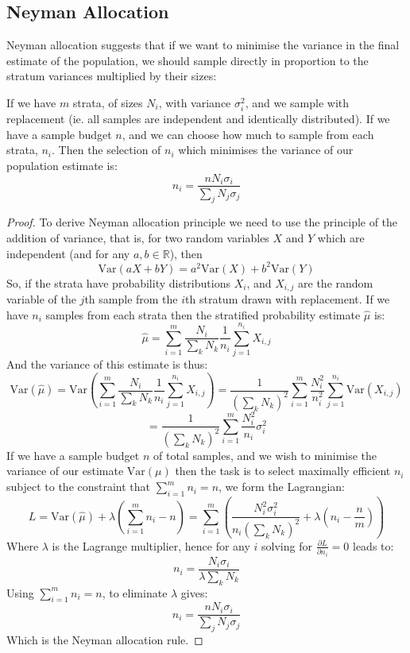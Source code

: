 \subsection{Neyman Allocation}\label{sec:neyman_sampling}

Neyman allocation suggests that if we want to minimise the variance in the final estimate of the population, we should sample directly in proportion to the stratum variances multiplied by their sizes:

\begin{theorem}\label{thm:neyman_selection}
If we have $m$ strata, of sizes $N_i$, with variance $\sigma_i^2$, and we sample with replacement (ie. all samples are independent and identically distributed). If we have a sample budget $n$, and we can choose how much to sample from each strata, $n_i$.
Then the selection of $n_i$ which minimises the variance of our population estimate is:
$$n_i = \frac{nN_i\sigma_i}{\sum_jN_j\sigma_j}$$
\end{theorem}
\begin{proof}
To derive Neyman allocation principle we need to use the principle of the addition of variance, that is, for two random variables $X$ and $Y$ which are independent (and for any $a,b\in \mathbb{R}$), then $$\text{Var}(aX+bY) = a^2\text{Var}(X)+b^2\text{Var}(Y)$$
So, if the strata have probability distributions $X_i$, and $X_{i,j}$ are the random variable of the $j$th sample from the $i$th stratum drawn with replacement. If we have $n_i$ samples from each strata then the stratified probability estimate $\hat{\mu}$ is:
$$ \hat{\mu} = \sum_{i=1}^m\frac{N_i}{\sum_kN_k}\frac{1}{n_i}\sum_{j=1}^{n_i}X_{i,j} $$
And the variance of this estimate is thus:
$$ \text{Var}(\hat{\mu}) = \text{Var}\left(\sum_{i=1}^m\frac{N_i}{\sum_kN_k}\frac{1}{n_i}\sum_{j=1}^{n_i}X_{i,j}\right) = \frac{1}{\left(\sum_kN_k\right)^2}\sum_{i=1}^m\frac{N_i^2}{n_i^2}\sum_{j=1}^{n_i}\text{Var}(X_{i,j})$$
\begin{equation}\label{eq:variance_decomposition_for_strata_mean}= \frac{1}{\left(\sum_kN_k\right)^2} \sum_{i=1}^m\frac{N_i^2}{n_i}\sigma_i^2 \end{equation}
If we have a sample budget $n$ of total samples, and we wish to minimise the variance of our estimate $\text{Var}(\mu)$ then the task is to select maximally efficient $n_i$ subject to the constraint that $\sum_{i=1}^m n_i = n$, we form the Lagrangian:
$$L = \text{Var}(\hat{\mu}) + \lambda\left(\sum_{i=1}^mn_i-n\right) = \sum_{i=1}^m\left(\frac{N_i^2\sigma_i^2}{n_i\left(\sum_kN_k\right)^2} + \lambda \left(n_i-\frac{n}{m}\right)\right)$$
Where $\lambda$ is the Lagrange multiplier, hence for any $i$ solving for $\frac{\partial L}{\partial n_i}=0$ leads to:
$$n_i = \frac{N_i\sigma_i}{\lambda\sum_kN_k}$$
Using $\sum_{i=1}^m n_i = n$, to eliminate $\lambda$ gives:
$$n_i = \frac{nN_i\sigma_i}{\sum_jN_j\sigma_j}$$
Which is the Neyman allocation rule.
\end{proof}

